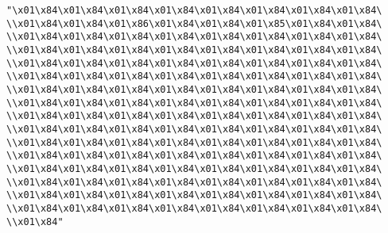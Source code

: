 \verb|"\x01\x84\x01\x84\x01\x84\x01\x84\x01\x84\x01\x84\x01\x84\x01\x84\|\newline
\verb|\\x01\x84\x01\x84\x01\x86\x01\x84\x01\x84\x01\x85\x01\x84\x01\x84\|\newline
\verb|\\x01\x84\x01\x84\x01\x84\x01\x84\x01\x84\x01\x84\x01\x84\x01\x84\|\newline
\verb|\\x01\x84\x01\x84\x01\x84\x01\x84\x01\x84\x01\x84\x01\x84\x01\x84\|\newline
\verb|\\x01\x84\x01\x84\x01\x84\x01\x84\x01\x84\x01\x84\x01\x84\x01\x84\|\newline
\verb|\\x01\x84\x01\x84\x01\x84\x01\x84\x01\x84\x01\x84\x01\x84\x01\x84\|\newline
\verb|\\x01\x84\x01\x84\x01\x84\x01\x84\x01\x84\x01\x84\x01\x84\x01\x84\|\newline
\verb|\\x01\x84\x01\x84\x01\x84\x01\x84\x01\x84\x01\x84\x01\x84\x01\x84\|\newline
\verb|\\x01\x84\x01\x84\x01\x84\x01\x84\x01\x84\x01\x84\x01\x84\x01\x84\|\newline
\verb|\\x01\x84\x01\x84\x01\x84\x01\x84\x01\x84\x01\x84\x01\x84\x01\x84\|\newline
\verb|\\x01\x84\x01\x84\x01\x84\x01\x84\x01\x84\x01\x84\x01\x84\x01\x84\|\newline
\verb|\\x01\x84\x01\x84\x01\x84\x01\x84\x01\x84\x01\x84\x01\x84\x01\x84\|\newline
\verb|\\x01\x84\x01\x84\x01\x84\x01\x84\x01\x84\x01\x84\x01\x84\x01\x84\|\newline
\verb|\\x01\x84\x01\x84\x01\x84\x01\x84\x01\x84\x01\x84\x01\x84\x01\x84\|\newline
\verb|\\x01\x84\x01\x84\x01\x84\x01\x84\x01\x84\x01\x84\x01\x84\x01\x84\|\newline
\verb|\\x01\x84\x01\x84\x01\x84\x01\x84\x01\x84\x01\x84\x01\x84\x01\x84\|\newline
\verb|\\x01\x84"|\newline
